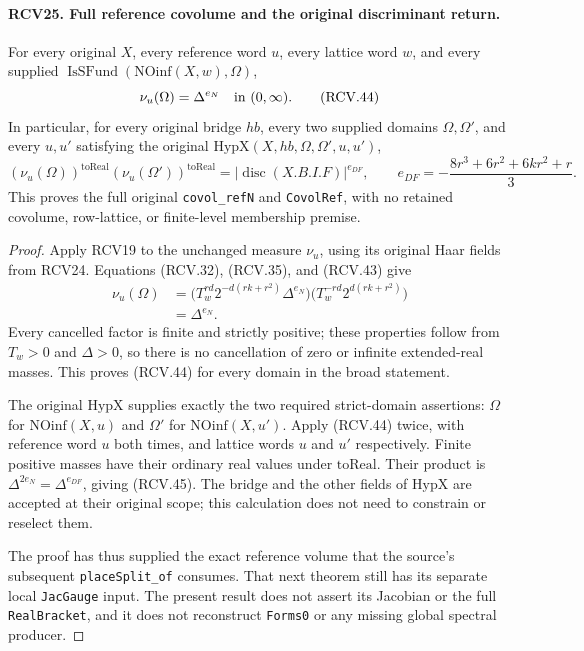 \documentclass[11pt,a4paper]{article}
\numberwithin{equation}{section}
\theoremstyle{remark}\newtheorem{remark}[theorem]{Remark}
\begin{document}
\paragraph{RCV25. Full reference covolume and the original discriminant return.}
\label{claim:RCV25}
For every original \(X\), every reference word \(u\), every
lattice word \(w\), and every supplied
\(\operatorname{IsSFund}(\mathrm{NOinf}(X,w),\Omega)\),
\[
                  \nu_u(\Omega)=\Delta^{e_N}
                         \quad\hbox{in }(0,\infty).
\tag{RCV.44}
\]
In particular, for every original bridge \(hb\), every two
supplied domains \(\Omega,\Omega'\), and every \(u,u'\)
satisfying the original \(\mathrm{HypX}(X,hb,\Omega,\Omega',u,u')\),
\[
 (\nu_u(\Omega))^{\mathrm{toReal}}
 (\nu_u(\Omega'))^{\mathrm{toReal}}
 =|\operatorname{disc}(X.B.I.F)|^{e_{DF}},\qquad
 e_{DF}=-\frac{8r^3+6r^2+6kr^2+r}{3}.
\tag{RCV.45}
\]
This proves the full original \texttt{covol\_\allowbreak ref\allowbreak N} and
\texttt{Covol\allowbreak Ref}, with no retained covolume, row-lattice, or
finite-level membership premise.
\begin{proof}
Apply RCV19 to the unchanged measure \(\nu_u\), using its
original Haar fields from RCV24.  Equations (RCV.32), (RCV.35),
and (RCV.43) give
\[
 \begin{split}
 \nu_u(\Omega)
 &=\big(T_w^{rd}2^{-d(rk+r^2)}\Delta^{e_N}\big)
                       \big(T_w^{-rd}2^{d(rk+r^2)}\big)\\
 &=\Delta^{e_N}.
 \end{split}
\]
Every cancelled factor is finite and strictly positive; these
properties follow from \(T_w>0\) and \(\Delta>0\), so there
is no cancellation of zero or infinite extended-real masses.
This proves (RCV.44) for every domain in the broad statement.

The original \(\mathrm{HypX}\) supplies exactly the two required
strict-domain assertions: \(\Omega\) for
\(\mathrm{NOinf}(X,u)\) and \(\Omega'\) for
\(\mathrm{NOinf}(X,u')\).  Apply (RCV.44) twice, with reference
word \(u\) both times, and lattice words \(u\) and \(u'\)
respectively.  Finite positive masses have their ordinary real values
under \(\mathrm{toReal}\).  Their product is
\(\Delta^{2e_N}=\Delta^{e_{DF}}\), giving (RCV.45).
The bridge and the other fields of \(\mathrm{HypX}\) are accepted
at their original scope; this calculation does not need to constrain
or reselect them.

The proof has thus supplied the exact reference volume that the
source's subsequent \texttt{place\allowbreak Split\_\allowbreak of} consumes.  That next
theorem still has its separate local \texttt{Jac\allowbreak Gauge} input.
The present result does not assert its Jacobian or the full
\texttt{Real\allowbreak Bracket}, and it does not reconstruct \texttt{Forms0}
or any missing global spectral producer.
\end{proof}
\end{document}

